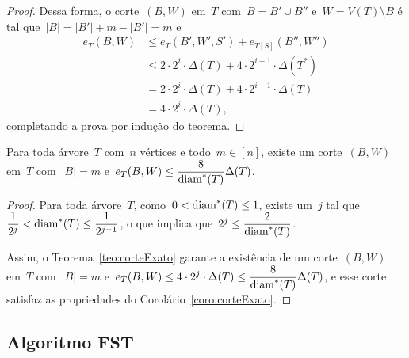 \begin{proof}
			Dessa forma, o corte~$(B,W)$ em~$T$
			com~${B=B'\cup B''}$ e~${W=V(T)\setminus B}$ é tal
			que~${|B|=|B'| + m-|B'| = m}$ e
			\begin{align}
				e_T(B,W)&\le e_T(B',W',S') + e_{T[S]}(B'',W'') 
				\nonumber\\
				&\le 2\cdot2^i\cdot\Delta(T) + 4\cdot 2^{i-1}\cdot
				\Delta(T^*)\nonumber\\
				&= 2\cdot2^i\cdot\Delta(T) + 4\cdot 2^{i-1}\cdot
				\Delta(T)\nonumber\\
				&= 4\cdot 2^{i}\cdot\Delta(T), \nonumber
			\end{align}
			completando a prova por indução do teorema.
	\end{proof}

	\bigskip
	\bigskip

	\begin{coro}
	\label{coro:corteExato}
		Para toda árvore~$T$ com~$n$ vértices e todo~${m\in[n]}$, existe
		um corte~$(B,W)$ em~$T$ com~${|B|=m}$ 
		e~${e_T(B,W)\le \dfrac{8}{\mathrm{diam}^*(T)}\Delta(T)}$.
	\end{coro}

	\begin{proof}
		Para toda árvore~$T$,
		como~$0<\mathrm{diam}^*(T)\le 1$,
		existe um~$j$ tal
		que~${\dfrac{1}{2^j}}<\mathrm{diam}^*(T)\le \dfrac{1}{2^{j-1}}$,
		o que implica que~${2^j\le\dfrac{2}{\mathrm{diam}^*(T)}}$.

		Assim, o Teorema~\ref{teo:corteExato} garante a existência de um 
		corte~$(B,W)$ em~$T$ com~${|B|=m}$ 
		e~$e_T(B,W)\le 4\cdot 2^j\cdot\Delta(T)\le \dfrac{8}{\mathrm{diam}^*(T)} \Delta(T)$,
		e esse corte satisfaz as propriedades do 
		Corolário~\ref{coro:corteExato}. 
	\end{proof}

	\bigskip
	\bigskip
	\bigskip
	\bigskip
	\bigskip

	\subsection{Algoritmo FST}

